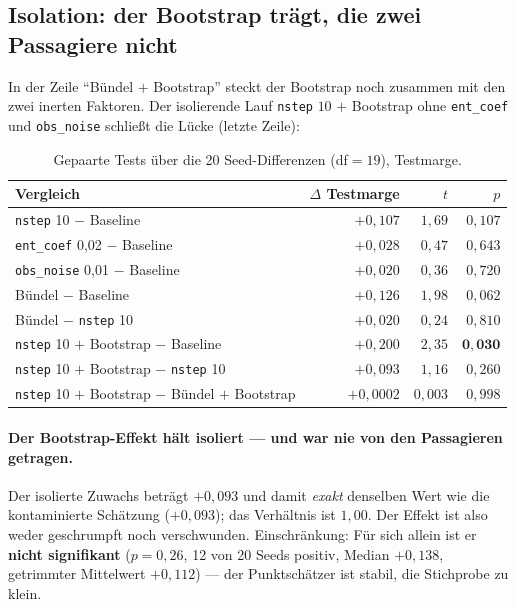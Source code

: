 \subsection{Isolation: der Bootstrap trägt, die zwei Passagiere nicht}

In der Zeile ``Bündel $+$ Bootstrap'' steckt der Bootstrap noch zusammen mit den zwei
inerten Faktoren. Der isolierende Lauf \texttt{nstep} $10$ $+$ Bootstrap ohne
\texttt{ent\_coef} und \texttt{obs\_noise} schließt die Lücke (letzte Zeile):

\begin{table}[H]
  \centering
  \caption{Gepaarte Tests über die 20 Seed-Differenzen (df$=19$), Testmarge.}
  \label{tab:a3c-paired}
  \small
  \begin{tabular}{lrrr}
    \toprule
    Vergleich & $\Delta$ Testmarge & $t$ & $p$\\
    \midrule
    \texttt{nstep} 10 $-$ Baseline            & $+0{,}107$ & $1{,}69$ & $0{,}107$\\
    \texttt{ent\_coef} 0,02 $-$ Baseline      & $+0{,}028$ & $0{,}47$ & $0{,}643$\\
    \texttt{obs\_noise} 0,01 $-$ Baseline     & $+0{,}020$ & $0{,}36$ & $0{,}720$\\
    Bündel $-$ Baseline                       & $+0{,}126$ & $1{,}98$ & $0{,}062$\\
    Bündel $-$ \texttt{nstep} 10              & $+0{,}020$ & $0{,}24$ & $0{,}810$\\
    \texttt{nstep} 10 $+$ Bootstrap $-$ Baseline & $+0{,}200$ & $2{,}35$ & $\mathbf{0{,}030}$\\
    \texttt{nstep} 10 $+$ Bootstrap $-$ \texttt{nstep} 10 & $+0{,}093$ & $1{,}16$ & $0{,}260$\\
    \texttt{nstep} 10 $+$ Bootstrap $-$ Bündel $+$ Bootstrap & $+0{,}0002$ & $0{,}003$ & $0{,}998$\\
    \bottomrule
  \end{tabular}
\end{table}

\paragraph{Der Bootstrap-Effekt hält isoliert --- und war nie von den Passagieren getragen.}
Der isolierte Zuwachs beträgt $+0{,}093$ und damit \emph{exakt} denselben Wert wie die
kontaminierte Schätzung ($+0{,}093$); das Verhältnis ist $1{,}00$. Der Effekt ist also
weder geschrumpft noch verschwunden. Einschränkung: Für sich allein ist er
\textbf{nicht signifikant} ($p=0{,}26$, 12 von 20 Seeds positiv, Median $+0{,}138$,
getrimmter Mittelwert $+0{,}112$) --- der Punktschätzer ist stabil, die Stichprobe zu klein.

